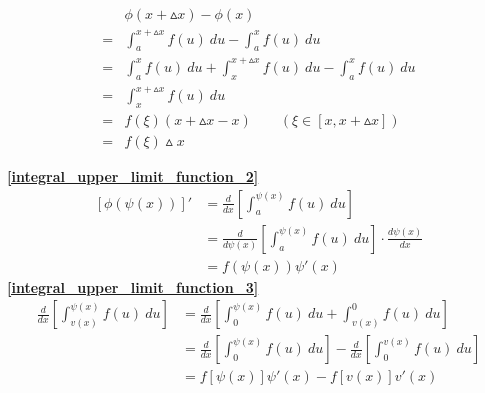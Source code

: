 \hfill
\hspace{0.5mm}
\vline
\hspace{0.5mm}
\begin{minipage}{.4\textwidth}
	\begin{align*}
		&\phi(x+\vartriangle x)-\phi(x)\\
		=&\int_{a}^{x+\vartriangle x}f(u)\ du-\int_{a}^{x}f(u)\ du\\
		=&\int_{a}^{x}f(u)\ du+\int_{x}^{x+\vartriangle x}f(u)\ du-\int_{a}^{x}f(u)\ du\\
		=&\int_{x}^{x+\vartriangle x}f(u)\ du\\
		=&f(\xi)(x+\vartriangle x-x)\qquad(\xi\in\left[x,x+\vartriangle x\right])\\
		=&f(\xi)\vartriangle x
	\end{align*}
\end{minipage}
\textbf{\large \ref{integral_upper_limit_function_2}}
\begin{align*}
		\left[\phi(\psi (x))\right]'&=\frac{d}{dx}\left[\int_{a}^{\psi(x)}f(u)\ du\right]\\
	&=\frac{d}{d\psi(x)}\left[\int_{a}^{\psi(x)}f(u)\ du\right]\cdot\frac{d\psi(x)}{dx}\\
	&=f(\psi(x))\psi'(x)
\end{align*}
\textbf{\large \ref{integral_upper_limit_function_3}}
\begin{align*}
	\frac{d}{dx}\left[\int_{v(x)}^{\psi(x)}f(u)\ du\right]&=\frac{d}{dx}\left[\int_{0}^{\psi(x)}f(u)\ du+\int_{v(x)}^{0}f(u)\ du\right]\\
	&=\frac{d}{dx}\left[\int_{0}^{\psi(x)}f(u)\ du\right]-\frac{d}{dx}\left[\int_{0}^{v(x)}f(u)\ du\right]\\
	&=f\left[\psi(x)\right]\psi'(x)-f\left[v(x)\right]v'(x)
\end{align*}
